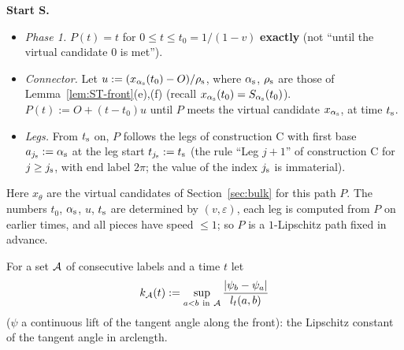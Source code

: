 \noindent\textbf{Start S.}
\begin{itemize}
\item \emph{Phase 1.} $P(t)=t$ for $0\le t\le t_0=1/(1-v)$ \textbf{exactly} (not ``until the virtual candidate $0$ is met'').
\item \emph{Connector.} Let $u:=(x_{\alpha_{\mathrm s}}(t_0)-O)/\rho_{\mathrm s}$, where $\alpha_{\mathrm s}$, $\rho_{\mathrm s}$ are those of Lemma~\ref{lem:ST-front}(e),(f)
(recall $x_{\alpha_{\mathrm s}}(t_0)=S_{\alpha_{\mathrm s}}(t_0)$). $P(t):=O+(t-t_0)u$ until $P$ meets the virtual candidate $x_{\alpha_{\mathrm s}}$, at time $t_{\mathrm s}$.
\item \emph{Legs.} From $t_{\mathrm s}$ on, $P$ follows the legs of construction C with first base $a_{j_{\mathrm s}}:=\alpha_{\mathrm s}$ at the leg start
$t_{j_{\mathrm s}}:=t_{\mathrm s}$ (the rule ``Leg $j+1$'' of construction C for $j\ge j_{\mathrm s}$, with end label $2\pi$; the value of the index $j_{\mathrm s}$ is
immaterial).
\end{itemize}
Here $x_\theta$ are the virtual candidates of Section~\ref{sec:bulk} for this path $P$. The numbers $t_0$, $\alpha_{\mathrm s}$, $u$, $t_{\mathrm s}$ are
determined by $(v,\varepsilon)$, each leg is computed from $P$ on earlier times, and all pieces have speed $\le1$; so $P$ is a
$1$-Lipschitz path fixed in advance.

For a set $\mathcal A$ of consecutive labels and a time $t$ let
\[
k_{\STcA}(t):=\sup_{a<b\ \text{in}\ \STcA}\frac{|\psi_b-\psi_a|}{l_t(a,b)}
\]
($\psi$ a continuous lift of the tangent angle along the front): the Lipschitz constant of the tangent angle in arclength.

